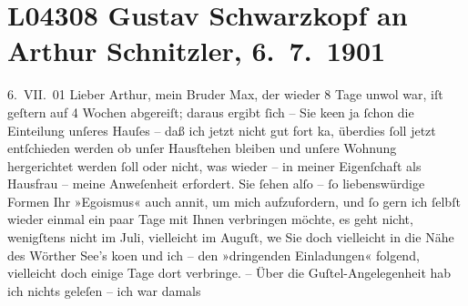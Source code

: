 

\section[Gustav Schwarzkopf an Arthur Schnitzler, 6. 7. 1901]{L04308 Gustav Schwarzkopf an Arthur Schnitzler, 6. 7. 1901}
\nopagebreak{}
\rehead{ }\normalsize\beginnumbering{}
\toendnotes[C]{\smallbreak\pagebreak[2]}
\toendnotes[C]{\smallbreak}
\toendnotes[C]{\smallbreak}
\pstart
           \raggedleft{}{\pb}6. VII. 01\pend
           \vspace{0.5em}
\pstart
           Lieber Arthur, mein Bruder Max, der wieder 8 Tage unwol war, iſt geſtern auf 4 Wochen abgereiſt; daraus
               ergibt{ }ſich – Sie ke{\geminationn}en ja{ }ſchon die Einteilung unſeres
               Hauſes – daß ich jetzt nicht gut fort ka{\geminationn}, überdies{ }ſoll
               jetzt entſchieden werden ob unſer Hausſtehen bleiben und unſere Wohnung hergerichtet werden{ }ſoll oder nicht,
               was wieder – in meiner Eigenſchaft als Hausfrau – meine Anweſenheit erfordert. Sie{ }ſehen alſo –{ }ſo liebenswürdige Formen Ihr »Egoismus« auch anni{\geminationm}t, um mich aufzufordern, und{ }ſo gern ich{ }ſelbſt wieder
               einmal ein paar Tage mit Ihnen verbringen möchte, es geht nicht, wenigſtens nicht im
               Juli, vielleicht im Auguſt, we{\geminationn} Sie doch vielleicht in
               die Nähe des Wörther See’s ko{\geminationm}en und ich – den {\pb}»dringenden Einladungen« folgend,
               vielleicht doch einige Tage dort verbringe. – Über die Guſtel-Angelegenheit hab ich nichts geleſen – ich war damals

